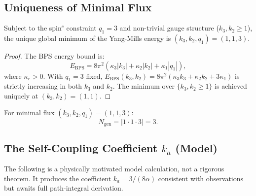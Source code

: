 \subsection{Uniqueness of Minimal Flux}\label{app:uniqueness}

\begin{theorem}\label{thm:energy-min}
Subject to the spin$^c$ constraint $q_1 = 3$ and non-trivial gauge structure ($k_3, k_2 \geq 1$), the unique global minimum of the Yang-Mills energy is $(k_3, k_2, q_1) = (1, 1, 3)$.
\end{theorem}

\begin{proof}
The BPS energy bound is:
\begin{equation}
E_{\text{BPS}} = 8\pi^2(\kappa_3 |k_3| + \kappa_2 |k_2| + \kappa_1 |q_1|),
\end{equation}
where $\kappa_r > 0$. With $q_1 = 3$ fixed, $E_{\text{BPS}}(k_3, k_2) = 8\pi^2(\kappa_3 k_3 + \kappa_2 k_2 + 3\kappa_1)$ is strictly increasing in both $k_3$ and $k_2$. The minimum over $\{k_3, k_2 \geq 1\}$ is achieved uniquely at $(k_3, k_2) = (1, 1)$.
\end{proof}

\begin{corollary}
For minimal flux $(k_3, k_2, q_1) = (1, 1, 3)$:
\begin{equation}
N_{\text{gen}} = |1 \cdot 1 \cdot 3| = 3.
\end{equation}
\end{corollary}

\subsection{The Self-Coupling Coefficient $k_a$ (Model)}\label{app:ka-model}

\begin{tcolorbox}[colback=yellow!5!white, colframe=yellow!60!black, title=Methodological Note]
The following is a physically motivated model calculation, not a rigorous theorem. It produces the coefficient $k_a = 3/(8\alpha)$ consistent with observations but awaits full path-integral derivation.
\end{tcolorbox}

